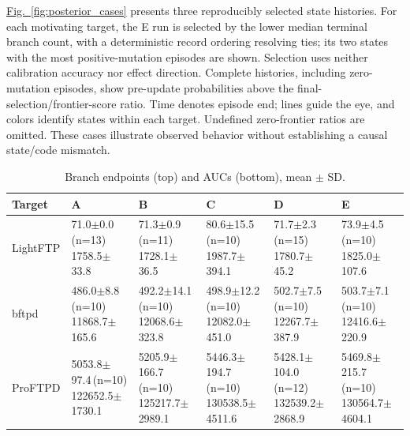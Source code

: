 \documentclass[final,5p,times,number]{elsarticle}
\newcommand{\namedref}[2]{\hyperref[#2]{#1~\ref*{#2}}}
\newcommand{\figref}[1]{\namedref{Fig.}{#1}}
\begin{document}
\figref{fig:posterior_cases} presents three reproducibly selected state histories. For each motivating target, the E run is selected by the lower median terminal branch count, with a deterministic record ordering resolving ties; its two states with the most positive-mutation episodes are shown. Selection uses neither calibration accuracy nor effect direction. Complete histories, including zero-mutation episodes, show pre-update probabilities above the final-selection/frontier-score ratio. Time denotes episode end; lines guide the eye, and colors identify states within each target. Undefined zero-frontier ratios are omitted. These cases illustrate observed behavior without establishing a causal state/code mismatch.



\begin{table}[!tbp]
\centering\small
\caption{Branch endpoints (top) and AUCs (bottom), mean $\pm$ SD.}
\label{tab:mainresults}
\begin{tabularx}{\textwidth}{l *{5}{>{\centering\arraybackslash}X}}
\toprule
Target & A & B & C & D & E \\
\midrule
LightFTP & \shortstack{71.0$\pm$0.0\,(n=13)\\1758.5$\pm$33.8} & \shortstack{71.3$\pm$0.9\,(n=11)\\1728.1$\pm$36.5} & \shortstack{80.6$\pm$15.5\,(n=10)\\1987.7$\pm$394.1} & \shortstack{71.7$\pm$2.3\,(n=15)\\1780.7$\pm$45.2} & \shortstack{73.9$\pm$4.5\,(n=10)\\1825.0$\pm$107.6} \\
\addlinespace[3pt]
bftpd & \shortstack{486.0$\pm$8.8\,(n=10)\\11868.7$\pm$165.6} & \shortstack{492.2$\pm$14.1\,(n=10)\\12068.6$\pm$323.8} & \shortstack{498.9$\pm$12.2\,(n=10)\\12082.0$\pm$451.0} & \shortstack{502.7$\pm$7.5\,(n=10)\\12267.7$\pm$387.9} & \shortstack{503.7$\pm$7.1\,(n=10)\\12416.6$\pm$220.9} \\
\addlinespace[3pt]
ProFTPD & \shortstack{5053.8$\pm$97.4\,(n=10)\\122652.5$\pm$1730.1} & \shortstack{5205.9$\pm$166.7\,(n=10)\\125217.7$\pm$2989.1} & \shortstack{5446.3$\pm$194.7\,(n=10)\\130538.5$\pm$4511.6} & \shortstack{5428.1$\pm$104.0\,(n=12)\\132539.2$\pm$2868.9} & \shortstack{5469.8$\pm$215.7\,(n=10)\\130564.7$\pm$4604.1} \\

\end{tabularx}
\end{table}
\end{document}
